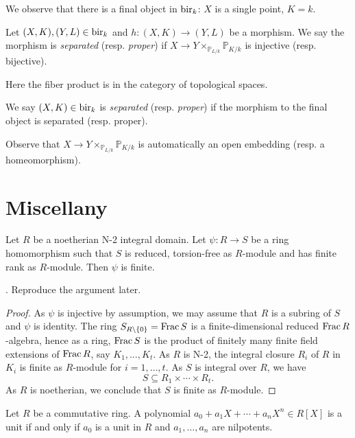 We observe that there is a final object in $\mathrm{bir}_k$: $X$ is a single point, $K=k$. 

\begin{definition}
    Let $(X,K),(Y,L)\in \mathrm{bir}_k$ and $h:(X,K)\rightarrow(Y,L)$ be a morphism. We say the morphism is \emph{separated} (resp. \emph{proper}) if $X\rightarrow Y\times_{\mathbb{P}_{L/k}}\mathbb{P}_{K/k}$ is injective (resp. bijective).

    Here the fiber product is in the category of topological spaces.

    We say $(X,K)\in \mathrm{bir}_k$ is \emph{separated} (resp. \emph{proper}) if the morphism to the final object is separated (resp. proper).
\end{definition}
Observe that $X\rightarrow Y\times_{\mathbb{P}_{L/k}}\mathbb{P}_{K/k}$ is automatically an open embedding (resp. a homeomorphism).



\section{Miscellany}

\begin{proposition}\label{prop-noethjapfinite}
    Let $R$ be a noetherian N-2 integral domain. Let $\psi:R\rightarrow S$ be a ring homomorphism such that $S$ is reduced, torsion-free as $R$-module and has finite rank as $R$-module. Then $\psi$ is finite.
\end{proposition}
\cite[Page~122]{BGR}. Reproduce the argument later.
\begin{proof}
    As $\psi$ is injective by assumption, we may assume that $R$ is a subring of $S$ and $\psi$ is identity. The ring $S_{R\setminus\{0\}}=\operatorname{Frac} S$ is a finite-dimensional reduced $\operatorname{Frac} R$-algebra, hence as a ring, $\operatorname{Frac} S$ is the product of finitely many finite field extensions of $\operatorname{Frac} R$, say $K_1,\ldots,K_t$.  As $R$ is N-2, the integral closure $R_i$ of $R$ in $K_i$ is finite as $R$-module for $i=1,\ldots,t$. As $S$ is integral over $R$, we have
    \[
        S\subseteq R_1\times \cdots \times R_t.  
    \]
    As $R$ is noetherian, we conclude that $S$ is finite as $R$-module.
\end{proof}

\begin{lemma}
    Let $R$ be a commutative ring. A polynomial $a_0+a_1X+\cdots+a_nX^n\in R[X]$ is a unit if and only if $a_0$ is a unit in $R$ and $a_1,\ldots,a_n$ are nilpotents.
\end{lemma}

\printbibliography
